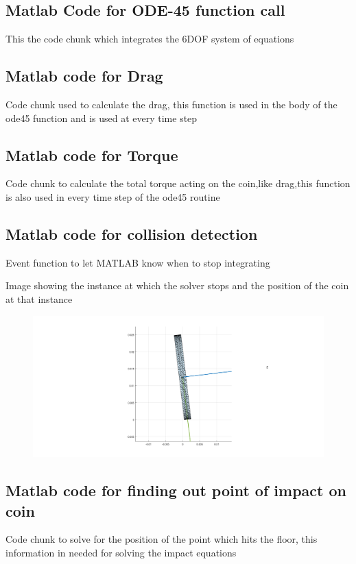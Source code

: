 \documentclass[11pt]{myclass}
\begin{document}
\subsection{Matlab Code for ODE-45 function call}
This the code chunk which integrates the 6DOF system of equations

\subsection{Matlab code for Drag}
Code chunk used to calculate the drag, this function is used in the body of the ode45 function and is used at every time step

\subsection{Matlab code for Torque}
Code chunk to calculate the total torque acting on the coin,like drag,this function is also used in every time step of the ode45 routine

\subsection{Matlab code for collision detection}
Event function to let MATLAB know when to stop integrating

Image showing the instance at which the solver stops and the position of the coin at that instance
\begin{figure}[H]
\includegraphics[scale = 0.25]{collision_photo.png}
\end{figure}
\subsection{Matlab code for finding out point of impact on coin}
Code chunk to solve for the position of the point which hits the floor, this information in needed for solving the impact equations

\end{document}
